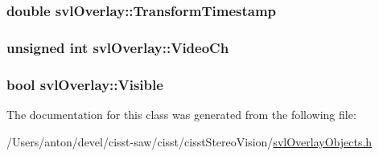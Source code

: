 \subsubsection[{Transform\+Timestamp}]{\setlength{\rightskip}{0pt plus 5cm}double svl\+Overlay\+::\+Transform\+Timestamp\hspace{0.3cm}{\ttfamily [protected]}}\label{classsvl_overlay_a5b67a9b8184c00fd1f1eddf10714efc0}
\hypertarget{classsvl_overlay_a3cb587204bc369c7f692d0db7cb74e72}{}
\subsubsection[{Video\+Ch}]{\setlength{\rightskip}{0pt plus 5cm}unsigned int svl\+Overlay\+::\+Video\+Ch\hspace{0.3cm}{\ttfamily [protected]}}\label{classsvl_overlay_a3cb587204bc369c7f692d0db7cb74e72}
\hypertarget{classsvl_overlay_a9cdf3aba60b4c4a291a5adc1c1cba139}{}
\subsubsection[{Visible}]{\setlength{\rightskip}{0pt plus 5cm}bool svl\+Overlay\+::\+Visible\hspace{0.3cm}{\ttfamily [protected]}}\label{classsvl_overlay_a9cdf3aba60b4c4a291a5adc1c1cba139}


The documentation for this class was generated from the following file\+:\begin{DoxyCompactItemize}
\item 
/\+Users/anton/devel/cisst-\/saw/cisst/cisst\+Stereo\+Vision/\hyperlink{svl_overlay_objects_8h}{svl\+Overlay\+Objects.\+h}\end{DoxyCompactItemize}
